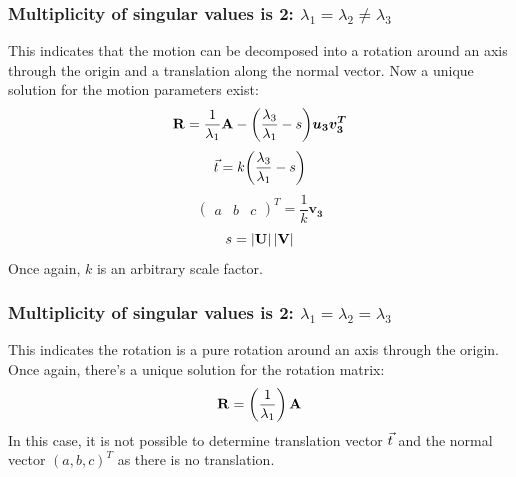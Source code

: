 \subsubsection{Multiplicity of singular values is 2: $\lambda_1 = \lambda_2 \neq \lambda_3$}
This indicates that the motion can be decomposed into a rotation around an axis through the origin and a translation along the normal vector. Now a unique solution for the motion parameters exist:
\begin{equation*}
    \mathbf{R} = \frac{1}{\lambda_1}\mathbf{A}-\biggl(\frac{\lambda_3}{\lambda_1}-s\biggr)\boldsymbol{u_3}\boldsymbol{v_3^T}
\end{equation*}
\begin{equation*}
    \vec t = k\biggl(\frac{\lambda_3}{\lambda_1}-s\biggr)
\end{equation*}
\begin{equation*}
    \begin{pmatrix}
        a & b & c
    \end{pmatrix}^T = \frac{1}{k}\boldsymbol{v_3}
\end{equation*}
\begin{equation*}
    s = \left| {\mathbf{U}} \right| \left| {\mathbf{V}} \right|
\end{equation*}
Once again, $k$ is an arbitrary scale factor.
\subsubsection{Multiplicity of singular values is 2: $\lambda_1 = \lambda_2 = \lambda_3$}
This indicates the rotation is a pure rotation around an axis through the origin. Once again, there's a unique solution for the rotation matrix:
\begin{equation*}
    \mathbf{R} = \left(\frac{1}{\lambda_1}\right)\mathbf{A}
\end{equation*}
In this case, it is not possible to determine translation vector $\vec t$ and the normal vector $(a, b, c)^T$ as there is no translation.
